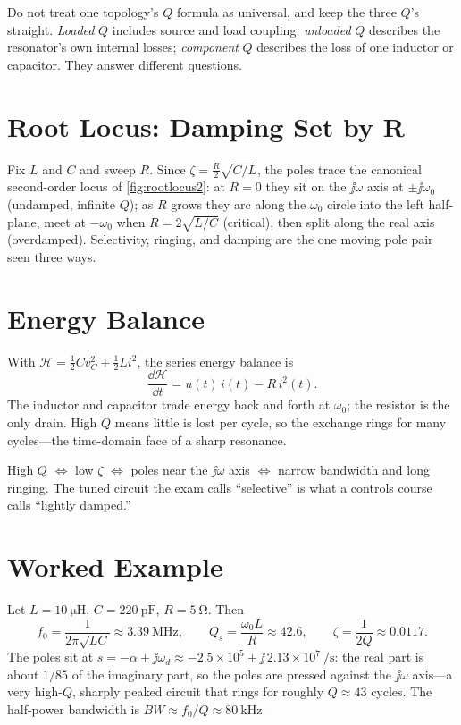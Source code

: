 \begin{mistakebox}
Do not treat one topology's \(Q\) formula as universal, and keep the three
\(Q\)'s straight. \emph{Loaded} \(Q\) includes source and load coupling;
\emph{unloaded} \(Q\) describes the resonator's own internal losses;
\emph{component} \(Q\) describes the loss of one inductor or capacitor. They
answer different questions.
\end{mistakebox}

\section{Root Locus: Damping Set by R}
Fix \(L\) and \(C\) and sweep \(R\). Since \(\zeta=\tfrac{R}{2}\sqrt{C/L}\), the
poles trace the canonical second-order locus of \cref{fig:rootlocus2}: at
\(R=0\) they sit on the \(\jj\omega\) axis at \(\pm\jj\omega_0\) (undamped,
infinite \(Q\)); as \(R\) grows they arc along the \(\omega_0\) circle into the
left half-plane, meet at \(-\omega_0\) when \(R=2\sqrt{L/C}\) (critical), then
split along the real axis (overdamped). Selectivity, ringing, and damping are the
one moving pole pair seen three ways.

\section{Energy Balance}
With \(\mathcal{H}=\tfrac12 Cv_C^2+\tfrac12 Li^2\), the series energy balance is
\[
\frac{\dd\mathcal{H}}{\dd t}=u(t)\,i(t)-R\,i^2(t).
\]
The inductor and capacitor trade energy back and forth at \(\omega_0\); the
resistor is the only drain. High \(Q\) means little is lost per cycle, so the
exchange rings for many cycles---the time-domain face of a sharp resonance.

\begin{controlsbox}
High \(Q\) \(\Leftrightarrow\) low \(\zeta\) \(\Leftrightarrow\) poles near the
\(\jj\omega\) axis \(\Leftrightarrow\) narrow bandwidth and long ringing. The tuned
circuit the exam calls ``selective'' is what a controls course calls ``lightly
damped.''
\end{controlsbox}

\section{Worked Example}
Let \(L=\SI{10}{\micro\henry}\), \(C=\SI{220}{\pico\farad}\), \(R=\SI{5}{\ohm}\).
Then
\[
f_0=\frac{1}{2\pi\sqrt{LC}}\approx\SI{3.39}{\mega\hertz},
\qquad
Q_s=\frac{\omega_0 L}{R}\approx 42.6,
\qquad
\zeta=\frac{1}{2Q}\approx0.0117.
\]
The poles sit at \(s=-\alpha\pm\jj\omega_d\approx-2.5\times10^5\pm\jj\,2.13\times10^7\ \si{\per\second}\):
the real part is about \(1/85\) of the imaginary part, so the poles are pressed
against the \(\jj\omega\) axis---a very high-\(Q\), sharply peaked circuit that
rings for roughly \(Q\approx43\) cycles. The half-power bandwidth is
\(BW\approx f_0/Q\approx\SI{80}{\kilo\hertz}\).
